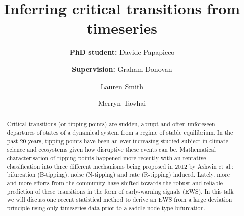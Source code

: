 \documentclass[dvipsnames, table, 11pt]{article}
\begin{document}
     \title{Inferring critical transitions from timeseries}

     \author[*]{\textbf{PhD student:} Davide Papapicco}
     \author[*]{\authorcr \textbf{Supervision:} Graham Donovan}
     \author[*]{Lauren Smith}
     \author[$\dagger$]{Merryn Tawhai}

 
     \date{}

     \maketitle

     \begin{abstract}
                Critical transitions (or tipping points) are sudden, abrupt and often unforeseen departures of states of a dynamical system from a regime of stable equilibrium.
                In the past 20 years, tipping points have been an ever increasing studied subject in climate science and ecosystems given how disruptive these events can be.
                Mathematical characterisation of tipping points happened more recently with an tentative classification into three different mechanisms being proposed in 2012 by Ashwin et al.: bifurcation (B-tipping), noise (N-tipping) and rate (R-tipping) induced.
                Lately, more and more efforts from the community have shifted towards the robust and reliable prediction of these transitions in the form of early-warning signals (EWS).
                In this talk we will discuss one recent statistical method to derive an EWS from a large deviation principle using only timeseries data prior to a saddle-node type bifurcation.
     \end{abstract}
\end{document}
